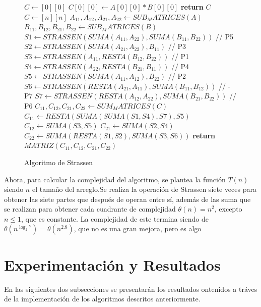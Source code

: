 \documentclass[12pt,twoside]{article}
\begin{document}
\begin{figure}[H]
    \centering
    \begin{algorithmic}
                \State $C \longleftarrow [0][0]$
                \State $C[0][0] \longleftarrow A[0][0]*B[0][0]$
                \State \textbf{return} $C$
            \Else
                \State $C \longleftarrow [n][n]$
                \State $A_{11}, A_{12}, A_{21}, A_{22} \longleftarrow SUB_MATRICES(A)$
                \State $B_{11}, B_{12}, B_{21}, B_{22} \longleftarrow SUB_MATRICES(B)$
                \State $S1 \longleftarrow STRASSEN(SUMA(A_{11}, A_{22}), SUMA(B_{11}, B_{22}))$ // P5
                \State $S2 \longleftarrow STRASSEN(SUMA(A_{21},A_{22}), B_{11})$ // P3
                \State $S3 \longleftarrow STRASSEN(A_{11}, RESTA(B_{12}, B_{22}))$ // P1
                \State $S4 \longleftarrow STRASSEN(A_{22}, RESTA(B_{21}, B_{11}))$ // P4
                \State $S5 \longleftarrow STRASSEN(SUMA(A_{11}, A_{12}), B_{22})$ // P2
                \State $S6 \longleftarrow STRASSEN(RESTA(A_{21}, A_{11}), SUMA(B_{11}, B_{12}))$ // -P7
                \State $S7 \longleftarrow STRASSEN(RESTA(A_{12}, A_{22}), SUMA(B_{21}, B_{22}))$ // P6
                \State $C_{11},C_{12},C_{21},C_{22} \longleftarrow SUM_MATRICES(C)$
                \State $C_{11} \longleftarrow RESTA ( SUMA ( SUMA ( S1, S4 ), S7 ), S5 )$
                \State $C_{12} \longleftarrow SUMA ( S3, S5 )$
                \State $C_{21} \longleftarrow SUMA ( S2, S4 )$
                \State $C_{22} \longleftarrow SUMA ( RESTA ( S1, S2 ), SUMA ( S3, S6 ) )$
                \State \textbf{return} $MATRIZ(C_{11},C_{12},C_{21},C_{22})$
            \EndIf
        \EndProcedure
    \end{algorithmic}
    \caption{Algoritmo de Strassen}
    \label{fig:strassen}
\end{figure}

Ahora, para calcular la complejidad del algoritmo, se plantea la funci\'on $T(n)$ siendo $n$ el tama\~no del arreglo.Se realiza la operaci\'on de Strassen siete veces para obtener las siete partes que despu\'es de operan entre s\'i, adem\'as de las suma que se realizan para obtener cada cuadrante de complejidad $\theta(n) = n^2$, excepto $n \leq 1$, que es constante. La complejidad de este termina siendo de $\theta(n^{\log_2{7}}) = \theta(n^{2.8})$, que no es una gran mejora, pero es algo


\section{Experimentaci\'on y Resultados}
En las siguientes dos subsecciones se presentar\'an los resultados ontenidos a tr\'aves de la implementaci\'on de los algoritmos descritos anteriormente.
\end{document}
